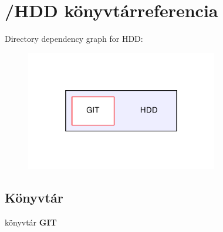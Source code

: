 \section{/\-H\-D\-D könyvtárreferencia}
\label{dir_69e7acb218dd06927fc21118cf03793b}
Directory dependency graph for H\-D\-D\-:
\nopagebreak
\begin{figure}[H]
\begin{center}
\leavevmode
\includegraphics[width=238pt]{dir_69e7acb218dd06927fc21118cf03793b_dep}
\end{center}
\end{figure}
\subsection*{Könyvtár}
\begin{DoxyCompactItemize}
\item 
könyvtár {\bf G\-I\-T}
\end{DoxyCompactItemize}
